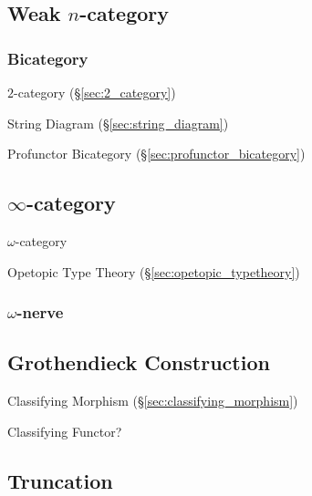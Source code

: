 \subsection{Weak $n$-category}\label{sec:weak_ncategory}

\subsubsection{Bicategory}\label{sec:bicategory}

$2$-category (\S\ref{sec:2_category})

String Diagram (\S\ref{sec:string_diagram})

Profunctor Bicategory (\S\ref{sec:profunctor_bicategory})



\subsection{$\infty$-category}\label{sec:infinity_category}

$\omega$-category

Opetopic Type Theory (\S\ref{sec:opetopic_typetheory})



\subsubsection{$\omega$-nerve}\label{sec:omega_nerve}



\subsection{Grothendieck Construction}
\label{sec:grothendieck_construction}

Classifying Morphism (\S\ref{sec:classifying_morphism})

Classifying Functor?



\subsection{Truncation}\label{sec:truncation}

